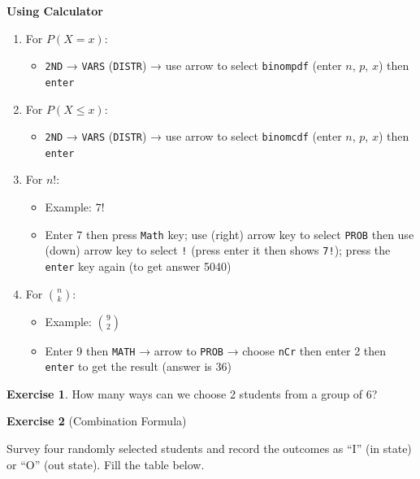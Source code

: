 \documentclass[
]{book}
\providecommand{\tightlist}{%
  \setlength{\itemsep}{0pt}\setlength{\parskip}{0pt}}
\begin{document}
\textbf{Using Calculator}

\begin{enumerate}
\def\labelenumi{\arabic{enumi}.}
\tightlist
\item
  For \(P(X = x)\):

  \begin{itemize}
  \tightlist
  \item
    \texttt{2ND} → \texttt{VARS} (\texttt{DISTR}) → use arrow to select \texttt{binompdf} (enter \(n\), \(p\), \(x\)) then \texttt{enter}
  \end{itemize}
\item
  For \(P(X \leq x)\):

  \begin{itemize}
  \tightlist
  \item
    \texttt{2ND} → \texttt{VARS} (\texttt{DISTR}) → use arrow to select \texttt{binomcdf} (enter \(n\), \(p\), \(x\)) then \texttt{enter}
  \end{itemize}
\item
  For \(n!\):

  \begin{itemize}
  \tightlist
  \item
    Example: \(7!\)
  \item
    Enter 7 then press \texttt{Math} key; use (right) arrow key to select \texttt{PROB} then use (down) arrow key to select \texttt{!} (press enter it then shows \texttt{7!}); press the \texttt{enter} key again (to get answer 5040)
  \end{itemize}
\item
  For \(\binom{n}{k}\):

  \begin{itemize}
  \tightlist
  \item
    Example: \(\binom{9}{2}\)
  \item
    Enter 9 then \texttt{MATH} → arrow to \texttt{PROB} → choose \texttt{nCr} then enter 2 then \texttt{enter} to get the result (answer is 36)
  \end{itemize}
\end{enumerate}

\textbf{Exercise 1}. How many ways can we choose 2 students from a group of 6?

\textbf{Exercise 2} (Combination Formula)

Survey four randomly selected students and record the outcomes as ``I'' (in state) or ``O'' (out state). Fill the table below.
\end{document}
